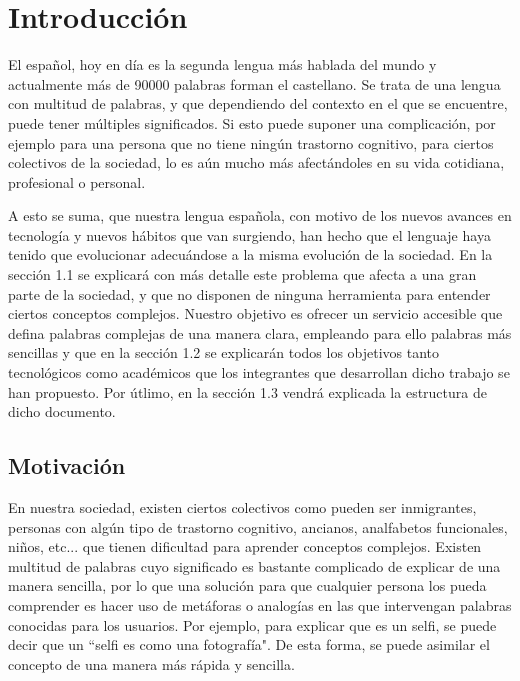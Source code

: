 \chapter{Introducción}
\label{cap:introduccion}


El español, hoy en día es la segunda lengua más hablada del mundo y actualmente más de 90000 palabras forman el castellano. 
Se trata de una lengua con multitud de palabras, y que dependiendo del contexto en el que se encuentre, puede tener múltiples significados.
Si esto puede suponer una complicación, por ejemplo para una persona que no tiene ningún trastorno cognitivo, para ciertos colectivos de la sociedad, lo es aún mucho más afectándoles en su vida cotidiana, profesional o personal. 

A esto se suma, que nuestra lengua española, con motivo de los nuevos avances en tecnología y nuevos hábitos que van surgiendo, han hecho que el lenguaje haya tenido que evolucionar adecuándose a la misma evolución de la sociedad.
En la sección 1.1 se explicará con más detalle este problema que afecta a una gran parte de la sociedad, y que no disponen de ninguna herramienta para entender ciertos conceptos complejos. 
Nuestro objetivo es ofrecer un servicio accesible que defina palabras complejas de una manera clara, empleando para ello palabras más sencillas y que en la sección 1.2 se explicarán todos los objetivos tanto tecnológicos como académicos que los integrantes que desarrollan dicho trabajo se han propuesto.
Por útlimo, en la sección 1.3 vendrá explicada la estructura de dicho documento.



	


\section{Motivación}
\label{cap:sec:motivacion}

En nuestra sociedad, existen ciertos colectivos como pueden ser inmigrantes, personas con algún tipo de trastorno cognitivo, ancianos, analfabetos funcionales, niños, etc... que tienen dificultad para aprender conceptos complejos. 
Existen multitud de palabras cuyo significado es bastante complicado de explicar de una manera sencilla, por lo que una solución para que cualquier persona los pueda comprender es hacer uso de metáforas o analogías en las que intervengan palabras conocidas para los usuarios. Por ejemplo, para explicar que es un selfi, se puede decir que un ``selfi es como una fotografía". De esta forma, se puede asimilar el concepto de una manera más rápida y sencilla.

